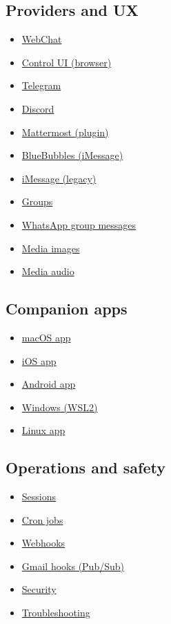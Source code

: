 \subsection{Providers and UX}


\begin{itemize}
  \item \href{/web/webchat}{WebChat}
  \item \href{/web/control-ui}{Control UI (browser)}
  \item \href{/channels/telegram}{Telegram}
  \item \href{/channels/discord}{Discord}
  \item \href{/channels/mattermost}{Mattermost (plugin)}
  \item \href{/channels/bluebubbles}{BlueBubbles (iMessage)}
  \item \href{/channels/imessage}{iMessage (legacy)}
  \item \href{/channels/groups}{Groups}
  \item \href{/channels/group-messages}{WhatsApp group messages}
  \item \href{/nodes/images}{Media images}
  \item \href{/nodes/audio}{Media audio}
\end{itemize}


\subsection{Companion apps}


\begin{itemize}
  \item \href{/platforms/macos}{macOS app}
  \item \href{/platforms/ios}{iOS app}
  \item \href{/platforms/android}{Android app}
  \item \href{/platforms/windows}{Windows (WSL2)}
  \item \href{/platforms/linux}{Linux app}
\end{itemize}


\subsection{Operations and safety}


\begin{itemize}
  \item \href{/concepts/session}{Sessions}
  \item \href{/automation/cron-jobs}{Cron jobs}
  \item \href{/automation/webhook}{Webhooks}
  \item \href{/automation/gmail-pubsub}{Gmail hooks (Pub/Sub)}
  \item \href{/gateway/security}{Security}
  \item \href{/gateway/troubleshooting}{Troubleshooting}
\end{itemize}



